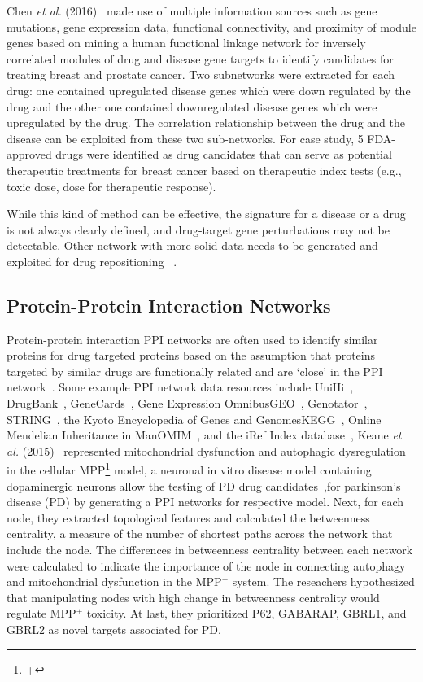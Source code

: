 Chen \textit{et al.} (2016)~\cite{chen_network_2016} made use of multiple information sources such as gene mutations, gene expression data, functional connectivity, and proximity of module genes based on mining a human functional linkage network for inversely correlated modules of drug and disease gene targets to identify candidates for treating breast and prostate cancer. Two subnetworks were extracted for each drug: one contained upregulated disease genes which were down regulated by the drug and the other one contained downregulated disease genes which were upregulated by the drug. The correlation relationship between the drug and the disease can be exploited from these two sub-networks. For case study, 5 FDA-approved drugs were identified as drug candidates that can serve as potential therapeutic treatments for breast cancer based on therapeutic index tests (e.g., toxic dose, dose for therapeutic response).

While this kind of method can be effective, the signature for a disease or a drug is not always clearly defined, and drug-target gene perturbations may not be detectable. Other network with more solid data needs to be generated and exploited for drug repositioning ~\cite{lotfi_shahreza_review_2018}.

\subsection{Protein-Protein Interaction Networks}

Protein-protein interaction \ac{PPI} networks are often used to identify similar proteins for drug targeted proteins based on the assumption that proteins targeted by similar drugs are functionally related and are ‘close’ in the PPI network~\cite{dai_survey_2015}. Some example PPI network data resources include UniHi~\cite{kalathur_unihi_2014}, DrugBank~\cite{law_drugbank_2014}, GeneCards~\cite{safran_genecards_2010}, Gene Expression Omnibus\ac{GEO}~\cite{clough_gene_2016}, Genotator~\cite{wall_genotator:_2010}, STRING~\cite{szklarczyk_string_2019}, the Kyoto Encyclopedia of Genes and Genomes\ac{KEGG}~\cite{kanehisa_kegg_2019}, Online Mendelian Inheritance in Man\ac{OMIM}~\cite{hamosh_online_2005}, and the iRef Index database~\cite{razick_irefindex:_2008}, Keane \textit{et al.} (2015)~\cite{keane_protein-protein_2015} represented mitochondrial dysfunction and autophagic dysregulation in the cellular MPP\footnote{+} model, a neuronal in vitro disease model containing dopaminergic neurons allow the testing of PD drug candidates~\cite{braungart_caenorhabditis_2004},for parkinson’s disease (PD) by generating a PPI networks for respective model. Next, for each node, they extracted topological features and calculated the betweenness centrality, a measure of the number of shortest paths across the network that include the node. The differences in betweenness centrality between each network were calculated to indicate the importance of the node in connecting autophagy and mitochondrial dysfunction in the MPP$^+$ system. The reseachers hypothesized that manipulating nodes with high change in betweenness centrality would regulate MPP$^+$ toxicity. At last, they prioritized P62, GABARAP, GBRL1, and GBRL2 as novel targets associated for PD.

